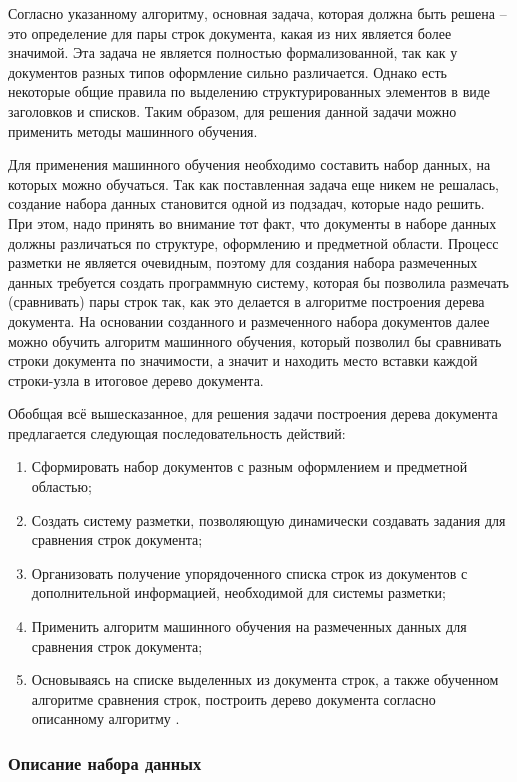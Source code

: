 Согласно указанному алгоритму, основная задача, которая должна быть решена -- это определение для пары строк документа, какая из них является более значимой.
Эта задача не является полностью формализованной, так как у документов разных типов оформление сильно различается.
Однако есть некоторые общие правила по выделению структурированных элементов в виде заголовков и списков.
Таким образом, для решения данной задачи можно применить методы машинного обучения.

Для применения машинного обучения необходимо составить набор данных, на которых можно обучаться.
Так как поставленная задача еще никем не решалась, создание набора данных становится одной из подзадач, которые надо решить.
При этом, надо принять во внимание тот факт, что документы в наборе данных должны различаться по структуре, оформлению и предметной области.
Процесс разметки не является очевидным, поэтому для создания набора размеченных данных требуется создать программную систему,
которая бы позволила размечать (сравнивать) пары строк так, как это делается в алгоритме построения дерева документа.
На основании созданного и размеченного набора документов далее можно обучить алгоритм машинного обучения,
который позволил бы сравнивать строки документа по значимости, а значит и находить место вставки каждой строки-узла в итоговое дерево документа.

Обобщая всё вышесказанное, для решения задачи построения дерева документа предлагается следующая последовательность действий:
\begin{enumerate}
    \item Сформировать набор документов с разным оформлением и предметной областью;
    \item Создать систему разметки, позволяющую динамически создавать задания для сравнения строк документа;
    \item Организовать получение упорядоченного списка строк из документов с дополнительной информацией, необходимой для системы разметки;
    \item Применить алгоритм машинного обучения на размеченных данных для сравнения строк документа;
    \item Основываясь на списке выделенных из документа строк, а также обученном алгоритме сравнения строк, построить дерево документа согласно описанному алгоритму .
\end{enumerate}

\subsubsection{Описание набора данных}

